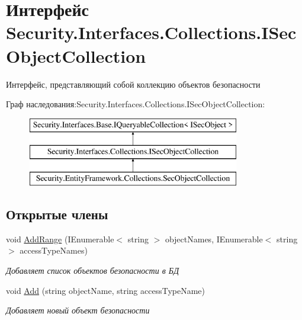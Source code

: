 \hypertarget{interface_security_1_1_interfaces_1_1_collections_1_1_i_sec_object_collection}{}\section{Интерфейс Security.\+Interfaces.\+Collections.\+I\+Sec\+Object\+Collection}
\label{interface_security_1_1_interfaces_1_1_collections_1_1_i_sec_object_collection}


Интерфейс, представляющий собой коллекцию объектов безопасности  


Граф наследования\+:Security.\+Interfaces.\+Collections.\+I\+Sec\+Object\+Collection\+:\begin{figure}[H]
\begin{center}
\leavevmode
\includegraphics[height=3.000000cm]{db/dd9/interface_security_1_1_interfaces_1_1_collections_1_1_i_sec_object_collection}
\end{center}
\end{figure}
\subsection*{Открытые члены}
\begin{DoxyCompactItemize}
\item 
void \hyperlink{interface_security_1_1_interfaces_1_1_collections_1_1_i_sec_object_collection_a8f59fde638c12e452e94df1410e009c6}{Add\+Range} (I\+Enumerable$<$ string $>$ object\+Names, I\+Enumerable$<$ string $>$ access\+Type\+Names)
\begin{DoxyCompactList}\small\item\em Добавляет список объектов безопасности в БД \end{DoxyCompactList}\item 
void \hyperlink{interface_security_1_1_interfaces_1_1_collections_1_1_i_sec_object_collection_ac93caa6a02f45242baab65dbef985c23}{Add} (string object\+Name, string access\+Type\+Name)
\begin{DoxyCompactList}\small\item\em Добавляет новый объект безопасности \end{DoxyCompactList}\end{DoxyCompactItemize}


